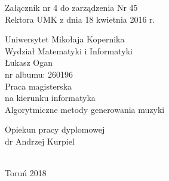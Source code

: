 \documentclass[]{book}
\title{}
\date{}
\author{}
\theoremstyle{definition}
\begin{document}
\begin{titlepage}
	
	\begin{flushright}
		Załącznik nr 4 do zarządzenia Nr 45 \\
		Rektora UMK z dnia 18 kwietnia 2016 r.
	\end{flushright}
	 
	
	\begin{center}
		{\huge Uniwersytet Mikołaja Kopernika\\} {\huge Wydział Matematyki i Informatyki\\}  \vspace{2.1cm} {\Large Łukasz Ogan\\}
	{\Large nr albumu: 260196\\}
		\vspace{2cm}
		{\Large Praca magisterska\\}
		{\Large na kierunku informatyka\\}
		\vspace{2cm} {\Huge Algorytmiczne metody generowania muzyki\\}
	\end{center}
	\hfill
	\begin{minipage}{6cm}
		\vspace{12mm}
		{Opiekun pracy dyplomowej\\
			dr Andrzej Kurpiel\\
			\\}
	\end{minipage}
	\vspace{3.5cm}
	\begin{center}
		{Toruń 2018\\}
	\end{center}
	\vspace{1.2cm}

\end{titlepage}	 

\tableofcontents







\end{document}
